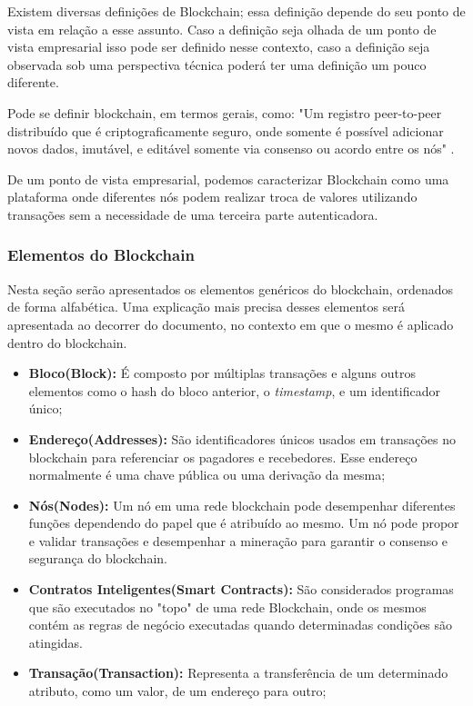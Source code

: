     Existem diversas definições de Blockchain; essa definição depende do seu ponto de vista em relação a esse assunto. Caso a definição seja olhada de um ponto de vista empresarial isso pode ser definido nesse contexto, caso a definição seja observada sob uma perspectiva técnica poderá ter uma definição um pouco diferente.
    
    Pode se definir blockchain, em termos gerais, como: "Um registro peer-to-peer distribuído que é criptograficamente seguro, onde somente é possível adicionar novos dados, imutável, e editável somente via consenso ou acordo entre os nós" \cite{mastering_blockchain}.
    
    De um ponto de vista empresarial, podemos caracterizar Blockchain como uma plataforma onde diferentes nós podem realizar troca de valores utilizando transações sem a necessidade de uma terceira parte autenticadora.
    
    \subsubsection{Elementos do Blockchain}
    
    Nesta seção serão apresentados os elementos genéricos do blockchain, ordenados de forma alfabética. Uma explicação mais precisa desses elementos será apresentada ao decorrer do documento, no contexto em que o mesmo é aplicado dentro do blockchain.
    
        \begin{itemize}
            \item \textbf{Bloco(Block):} É composto por múltiplas transações e alguns outros elementos como o hash do bloco anterior, o \textit{timestamp}, e um identificador único; 
            
            \item \textbf{Endereço(Addresses):} São identificadores únicos usados em transações no blockchain para referenciar os pagadores e recebedores. Esse endereço normalmente é uma chave pública ou uma derivação da mesma;
            
            \item \textbf{Nós(Nodes):} Um nó em uma rede blockchain pode desempenhar diferentes funções dependendo do papel que é atribuído ao mesmo. Um nó pode propor e validar transações e desempenhar a mineração para garantir o consenso e segurança do blockchain.
            
            \item \textbf{Contratos Inteligentes(Smart Contracts):} São considerados programas que são executados no "topo" de uma rede Blockchain, onde os mesmos contém as regras de negócio executadas quando determinadas condições são atingidas.
            
            \item \textbf{Transação(Transaction):} Representa a transferência de um determinado atributo, como um valor, de um endereço para outro;
            
            
            
        \end{itemize}

